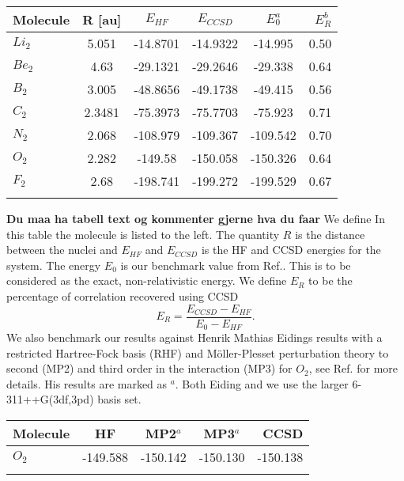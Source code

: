 \begin{center}
\begin{tabular}{ l c  c c c r }
	\hline
  	Molecule & R [au] & $E_{HF}$ & $E_{CCSD}$ & 	$E_0^a$ & $E_R^b$ \\ \hline
  	$Li_2$ & 5.051 & -14.8701 & -14.9322 & -14.995 &  0.50 \\\hline
  	$Be_2$ & 4.63 & -29.1321 & -29.2646 & -29.338 &  0.64 \\ \hline
  	$B_2$ & 3.005 & -48.8656 & -49.1738 & -49.415 &  0.56 \\ \hline
  	$C_2$ & 2.3481 & -75.3973 & -75.7703 & -75.923 &  0.71 \\ \hline
  	$N_2$ & 2.068 & -108.979 & -109.367 & -109.542 & 0.70 \\ \hline
  	$O_2$ & 2.282 & -149.58 & -150.058 & -150.326 & 0.64  \\ \hline
  	$F_2$ & 2.68 & -198.741 & -199.272 & -199.529 & 0.67 \\ \hline
  	\\
	\end{tabular}
\end{center}
{\bf Du maa ha tabell text og kommenter gjerne hva du faar} We define
In this table the molecule is listed to the left. The quantity $R$ is the distance
between the nuclei and $E_{HF}$ and $E_{CCSD}$ is the HF and CCSD
energies for the system. The energy $E_0$ is our benchmark value from
Ref.\cite{first_row_diatomic_referance_stuff}. This is to be considered as the exact,
non-relativistic energy. We define $E_R$ to be
the percentage of correlation recovered using CCSD
\begin{equation}
E_R = \frac{E_{CCSD} - E_{HF}}{E_0 - E_{HF}} .
\end{equation}
We also benchmark our results against Henrik Mathias Eidings results with a restricted Hartree-Fock basis (RHF) and M\"oller-Plesset perturbation theory to second (MP2) and third order in the interaction (MP3)
for $O_2$, see Ref.\cite{hmeiding} for more details. His results
are marked as $^a$. Both Eiding and we use the larger 6-311++G(3df,3pd) basis set.
\begin{center}
\begin{tabular}{ l c c c r }
	\hline
  	Molecule & HF & MP2$^a$ & MP3$^a$ & CCSD \\ \hline
  	$O_2$ & -149.588 & -150.142 & -150.130 & -150.138 \\\hline
  	\\
	\end{tabular}
\end{center}

